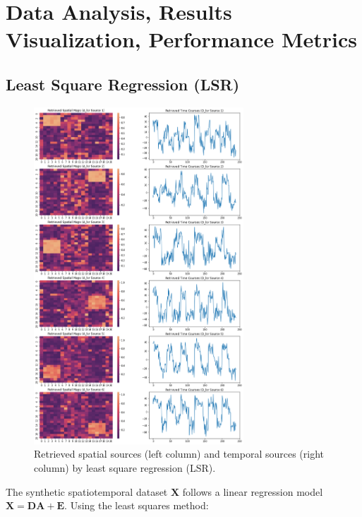 \documentclass[11pt]{article}
\begin{document}
\section{Data Analysis, Results Visualization, Performance Metrics}

\subsection{Least Square Regression (LSR)}
\label{section:lsr}

    \begin{figure}[H]
        \begin{center}
            \includegraphics[width=0.7\textwidth]{../plots/2_1_Alsr_Dlsr}
        \caption{Retrieved spatial sources (left column) and temporal sources (right column) by least square regression (LSR).}
        \label{fig:lsr_all}
        \end{center}
    \end{figure}

The synthetic spatiotemporal dataset $\mathbf{X}$ follows a linear regression model $\mathbf{X} = \mathbf{DA} + \mathbf{E}$. Using the least squares method:
\end{document}
